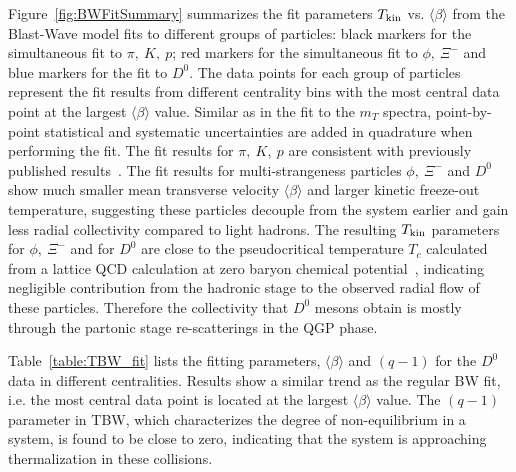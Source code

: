 \documentclass[%
 reprint,	
 amsmath,amssymb,
 aps,
 prc,
]{revtex4-1}
\begin{document}
Figure~\ref{fig:BWFitSummary} summarizes the fit parameters $T_{\rm kin}$ vs. $\langle\beta\rangle$ from the Blast-Wave model fits to different groups of particles: black markers for the simultaneous fit to $\pi,\ K,\ p$; red markers for the simultaneous fit to $\phi,\ \Xi^-$ and blue markers for the fit to $D^0$. The data points for each group of particles represent the fit results from different centrality bins with the most central data point at the largest $\langle\beta\rangle$ value. Similar as in the fit to the $m_{T}$ spectra, point-by-point statistical and systematic uncertainties are added in quadrature when performing the fit. The fit results for $\pi,\ K,\ p$ are consistent with previously published results~\cite{Tang:2008ud}. The fit results for multi-strangeness particles $\phi,\ \Xi^{-}$ and $D^0$ show much smaller mean transverse velocity $\langle\beta\rangle$ and larger kinetic freeze-out temperature, suggesting these particles decouple from the system earlier and gain less radial collectivity compared to light hadrons. The resulting $T_{\rm kin}$ parameters for $\phi,\ \Xi^-$ and for $D^0$ are close to the pseudocritical temperature $T_{c}$ calculated from a lattice QCD calculation at zero baryon chemical potential~\cite{Bazavov:2011nk}, indicating negligible contribution from the hadronic stage to the observed radial flow of these particles. Therefore the collectivity that $D^0$ mesons obtain is mostly through the partonic stage re-scatterings in the QGP phase. 

Table~\ref{table:TBW_fit} lists the fitting parameters, $\langle\beta\rangle$ and $(q-1)$ for the $D^0$ data in different centralities. Results show a similar trend as the regular BW fit, i.e. the most central data point is located at the largest $\langle\beta\rangle$ value. The $(q-1)$ parameter in TBW, which characterizes the degree of non-equilibrium in a system, is found to be close to zero, indicating that the system is approaching thermalization in these collisions.
\end{document}
